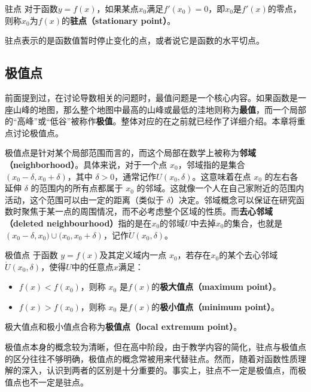 \begin{definition}{驻点}
对于函数$y=f(x)$，如果某点$x_0$满足$f'(x_0)=0$，即$x_0$是$f'(x)$的零点，则称$x_0$为$f(x)$的\textbf{驻点（stationary point）}。
\end{definition}

驻点表示的是函数值暂时停止变化的点，或者说它是函数的水平切点。

\subsection{极值点}

前面提到过，在讨论导数相关的问题时，最值问题是一个核心内容。如果函数是一座山峰的地图，那么整个地图中最高的山峰或最低的洼地则称为\textbf{最值}，而一个局部的“高峰”或“低谷”被称作\textbf{极值}。整体对应的在之前就已经作了详细介绍。本章将重点讨论极值点。

极值点是针对某个局部范围而言的，而这个局部在数学上被称为\textbf{邻域（neighborhood）}。具体来说，对于一个点 $x_0$，邻域指的是集合 $\left( x_0 - \delta, x_0 + \delta \right)$，其中 $\delta > 0$，通常记作${U}(x_0, \delta)$。这意味着在点 $x_0$ 的左右各延伸 $\delta$ 的范围内的所有点都属于 $x_0$ 的邻域。这就像一个人在自己家附近的范围内活动，这个范围可以由一定的距离（类似于 $\delta$）决定。邻域概念可以保证在研究函数时聚焦于某一点的周围情况，而不必考虑整个区域的性质。而\textbf{去心邻域（deleted neighbourhood）}指的是在$x_0$的邻域$U$中去掉$x_0$的集合，也就是$\left( x_0 - \delta,x_0)\cup(x_0, x_0 + \delta \right)$，记作$\mathring{U}(x_0,\delta)$。

\begin{definition}{极值点}
于函数 $y=f(x)$及其定义域内一点 $x_0$，若存在$x_0$的某个去心邻域$\mathring{U}(x_0,\delta)$，使得$U$中的任意点$x$满足：
\begin{itemize}
\item $f(x) < f\left(x_0\right)$，则称 $x_0$ 是$f(x)$的\textbf{极大值点（maximum point）}。
\item $f(x) > f\left(x_0\right)$，则称 $x_0$ 是$f(x)$的\textbf{极小值点（minimum point）}。
\end{itemize}
极大值点和极小值点合称为\textbf{极值点（local extremum point）}。
\end{definition}

极值点本身的概念较为清晰，但在高中阶段，由于教学内容的简化，驻点与极值点的区分往往不够明确，极值点的概念常被用来代替驻点。然而，随着对函数性质理解的深入，认识到两者的区别是十分重要的。事实上，驻点不一定是极值点，而极值点也不一定是驻点。

